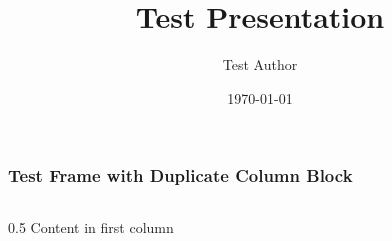 \documentclass{beamer}
\title{Test Presentation}
\author{Test Author}
\date{\today}
\begin{document}
\begin{frame}
  \frametitle{Test Frame with Duplicate Column Block}
  \begin{columns}
    \begin{column}{0.5\textwidth}
      Content in first column
    \end{column}
  \end{columns}
\end{frame}
\end{document}
